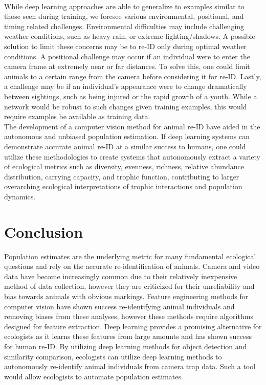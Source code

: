 \documentclass[11pt]{article}
\begin{document}
\newline
\\
While deep learning approaches are able to generalize to examples similar to those seen during training, we foresee various environmental, positional, and timing related challenges. Environmental difficulties may include challenging weather conditions, such as heavy rain, or extreme lighting/shadows. A possible solution to limit these concerns may be to re-ID only during optimal weather conditions. A positional challenge may occur if an individual were to enter the camera frame at extremely near or far distances. To solve this, one could limit animals to a certain range from the camera before considering it for re-ID. Lastly, a challenge may be if an individual's appearance were to change dramatically between sightings, such as being injured or the rapid growth of a youth. While a network would be robust to such changes given training examples, this would require examples be available as training data. 
\newline
\\
The development of a computer vision method for animal re-ID have aided in the autonomous and unbiased population estimation. If deep learning systems can demonstrate accurate animal re-ID at a similar success to humans, one could utilize these methodologies to create systems that autonomously extract a variety of ecological metrics such as diversity, evenness, richness, relative abundance distribution, carrying capacity, and trophic function, contributing to larger overarching ecological interpretations of trophic interactions and population dynamics.
\newline
\\
\section*{Conclusion}
Population estimates are the underlying metric for many fundamental ecological questions and rely on the accurate re-identification of animals. Camera and video data have become increasingly common due to their relatively inexpensive method of data collection, however they are criticized for their unreliability and bias towards animals with obvious markings. Feature engineering methods for computer vision have shown success re-identifying animal individuals and removing biases from these analyses, however these methods require algorithms designed for feature extraction. Deep learning provides a promising alternative for ecologists as it learns these features from large amounts and has shown success for human re-ID. By utilizing deep learning methods for object detection and similarity comparison, ecologists can utilize deep learning methods to autonomously re-identify animal individuals from camera trap data. Such a tool would allow ecologists to automate population estimates.
\end{document}
